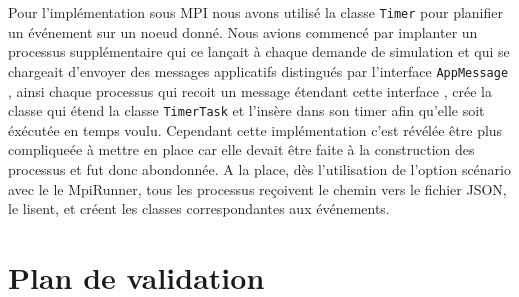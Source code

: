 \documentclass{article}
\begin{document}
				\vspace{5mm}
				Pour l'implémentation sous MPI nous avons utilisé la classe \verb|Timer| pour planifier un événement sur un noeud donné.
				\newline
				Nous avions commencé par implanter un processus supplémentaire qui ce lançait à chaque demande de simulation et qui se chargeait d'envoyer des 
				messages applicatifs distingués par l'interface \verb|AppMessage| , ainsi chaque processus qui recoit un message étendant cette interface , crée la classe 
				qui étend la classe \verb|TimerTask| et l'insère dans son timer afin qu'elle soit éxécutée en temps voulu.
				\newline
				Cependant cette implémentation c'est révélée être plus compliqueée à mettre en place car elle devait être faite à la construction des processus et fut donc abondonnée.
				\newline
				A la place, dès l'utilisation de l'option scénario avec le le MpiRunner, tous les processus reçoivent le chemin vers le fichier JSON, le lisent, et créent les classes correspondantes aux événements. 
		
				
		\newpage
		\section{Plan de validation}
\end{document}
